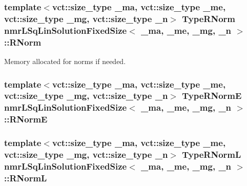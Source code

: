 \hypertarget{classnmr_l_sq_lin_solution_fixed_size_ab8968759e536db86f658fe569aec7c4c}{
\subsubsection[{R\-Norm}]{\setlength{\rightskip}{0pt plus 5cm}template$<$vct\-::size\-\_\-type \-\_\-ma, vct\-::size\-\_\-type \-\_\-me, vct\-::size\-\_\-type \-\_\-mg, vct\-::size\-\_\-type \-\_\-n$>$ {\bf Type\-R\-Norm} {\bf nmr\-L\-Sq\-Lin\-Solution\-Fixed\-Size}$<$ \-\_\-ma, \-\_\-me, \-\_\-mg, \-\_\-n $>$\-::R\-Norm\hspace{0.3cm}{\ttfamily [protected]}}}\label{classnmr_l_sq_lin_solution_fixed_size_ab8968759e536db86f658fe569aec7c4c}
Memory allocated for norms if needed. \hypertarget{classnmr_l_sq_lin_solution_fixed_size_a7db2609534904651db0df467d94c13ad}{
\subsubsection[{R\-Norm\-E}]{\setlength{\rightskip}{0pt plus 5cm}template$<$vct\-::size\-\_\-type \-\_\-ma, vct\-::size\-\_\-type \-\_\-me, vct\-::size\-\_\-type \-\_\-mg, vct\-::size\-\_\-type \-\_\-n$>$ {\bf Type\-R\-Norm\-E} {\bf nmr\-L\-Sq\-Lin\-Solution\-Fixed\-Size}$<$ \-\_\-ma, \-\_\-me, \-\_\-mg, \-\_\-n $>$\-::R\-Norm\-E\hspace{0.3cm}{\ttfamily [protected]}}}\label{classnmr_l_sq_lin_solution_fixed_size_a7db2609534904651db0df467d94c13ad}
\hypertarget{classnmr_l_sq_lin_solution_fixed_size_ae7fc2b92147410b773caab779fefcb66}{
\subsubsection[{R\-Norm\-L}]{\setlength{\rightskip}{0pt plus 5cm}template$<$vct\-::size\-\_\-type \-\_\-ma, vct\-::size\-\_\-type \-\_\-me, vct\-::size\-\_\-type \-\_\-mg, vct\-::size\-\_\-type \-\_\-n$>$ {\bf Type\-R\-Norm\-L} {\bf nmr\-L\-Sq\-Lin\-Solution\-Fixed\-Size}$<$ \-\_\-ma, \-\_\-me, \-\_\-mg, \-\_\-n $>$\-::R\-Norm\-L\hspace{0.3cm}{\ttfamily [protected]}}}\label{classnmr_l_sq_lin_solution_fixed_size_ae7fc2b92147410b773caab779fefcb66}
